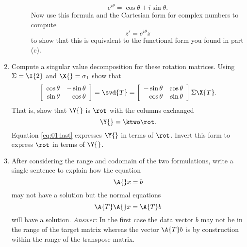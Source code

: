 \begin{enumerate}
\begin{description}
\begin{equation}
  e^{ i \theta } = \cos \theta + i \sin \theta.
\end{equation}
Now use this formula and the Cartesian form for complex numbers to compute
\begin{equation}
  z' = e^{ i \theta } z
\end{equation}
to show that this is equivalent to the functional form you found in part (c).
\end{description}
\item Compute a singular value decomposition for these rotation matrices. Using $ \Sigma = \I{2} $ and $ \X{} = \sigma_1 $ show that
\begin{equation}
  \left[
  \begin{array}{ rr }
    \cos \theta & -\sin \theta \\
    \sin \theta & \cos \theta
  \end{array}
  \right]
    =
    \svd{T}
    =
  \left[
  \begin{array}{ rr }
    -\sin \theta & \cos \theta \\
    \cos \theta & \sin \theta
  \end{array}
  \right] \Sigma \X{T}.
\end{equation}
That is, show that $ \Y{} $ is $ \rot $ with the columns exchanged
\begin{equation}
  \Y{} = \ktwo \rot.
  \label{eq:01:last}
\end{equation}
Equation \eqref{eq:01:last} expresses $ \Y{} $ in terms of $ \rot $. Invert this form to express $ \rot $ in terms of $ \Y{} $.
\item After considering the range and codomain of the two formulations, write a single sentence to explain how the equation
\begin{equation}
  \A{}x=b
\end{equation}
may not have a solution but the normal equations
\begin{equation}
  \A{T}\A{}x=\A{T}b
\end{equation}
will have a solution. 
\textit{Answer:} In the first case the data vector $b$ may not be in the range of the target matrix whereas the vector $\A{T}b$ is by construction within the range of the transpose matrix.
\end{enumerate}

\endinput